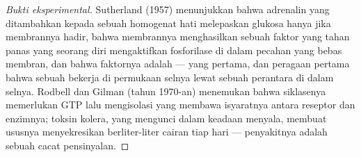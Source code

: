\begin{proof}[Bukti eksperimental]
Sutherland (1957) menunjukkan bahwa adrenalin yang ditambahkan kepada
sebuah homogenat hati melepaskan glukosa hanya jika membrannya hadir,
bahwa membrannya menghasilkan sebuah faktor yang tahan panas yang
seorang diri mengaktifkan fosforilase di dalam pecahan yang bebas
membran, dan bahwa faktornya adalah  ---  yang
pertama, dan peragaan pertama bahwa sebuah  bekerja di permukaan
selnya lewat sebuah perantara di dalam selnya. Rodbell dan Gilman
(tahun 1970-an) menemukan bahwa siklasenya memerlukan GTP lalu
mengisolasi  yang membawa isyaratnya antara reseptor dan
enzimnya; toksin kolera, yang mengunci  dalam keadaan
menyala, membuat ususnya menyekresikan berliter-liter cairan tiap hari
--- penyakitnya adalah sebuah cacat pensinyalan.
\end{proof}

